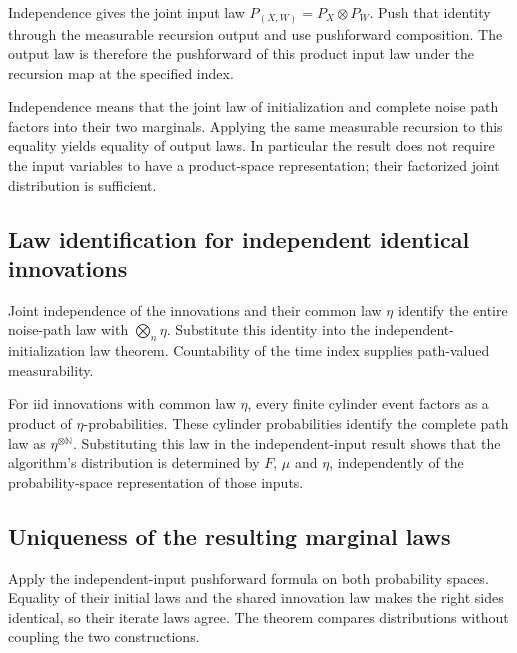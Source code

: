 \documentclass[11pt,a4paper]{article}
\begin{document}
Independence gives the joint input law \(P_{(X,W)}=P_X\otimes P_W\). Push that identity through the measurable recursion output and use pushforward composition. The output law is therefore the pushforward of this product input law under the recursion map at the specified index.



Independence means that the joint law of initialization and complete noise path factors into their two marginals. Applying the same measurable recursion to this equality yields equality of output laws. In particular the result does not require the input variables to have a product-space representation; their factorized joint distribution is sufficient.


\subsection{\texorpdfstring{Law identification for independent identical innovations}{Law identification for independent identical innovations}}


Joint independence of the innovations and their common law \(\eta\) identify the entire noise-path law with \(\bigotimes_n\eta\). Substitute this identity into the independent-initialization law theorem. Countability of the time index supplies path-valued measurability.



For iid innovations with common law \(\eta\), every finite cylinder event factors as a product of \(\eta\)-probabilities. These cylinder probabilities identify the complete path law as \(\eta^{\otimes\mathbb N}\). Substituting this law in the independent-input result shows that the algorithm's distribution is determined by \(F\), \(\mu\) and \(\eta\), independently of the probability-space representation of those inputs.


\subsection{\texorpdfstring{Uniqueness of the resulting marginal laws}{Uniqueness of the resulting marginal laws}}


Apply the independent-input pushforward formula on both probability spaces. Equality of their initial laws and the shared innovation law makes the right sides identical, so their iterate laws agree. The theorem compares distributions without coupling the two constructions.
\end{document}
